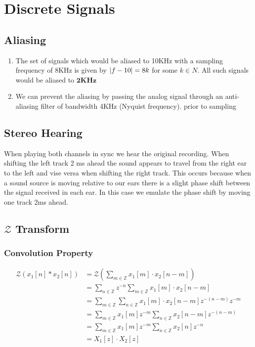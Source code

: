 \section{Discrete Signals}
\subsection{Aliasing}
\begin{enumerate}
  \item The set of signals which would be aliased to 10KHz with a sampling frequency of 8KHz is given by $\sizeof{f - 10} = 8k$ for some $k\in N$.
  All such signals would be aliased to $\textbf{2KHz}$

  \item We can prevent the aliasing by passing the analog signal through an anti-aliasing filter of bandwidth 4KHz (Nyquist frequency).
  prior to sampling
\end{enumerate}

\subsection{Stereo Hearing}
When playing both channels in sync we hear the original recording.
When shifting the left track 2 ms ahead the sound appears to travel from the right ear to the left and vise versa when shifting the right track.
This occurs because when a sound source is moving relative to our ears there is a slight phase shift between the signal received in each ear.
In this case we emulate the phase shift by moving one track 2ms ahead.


\subsection{$\mathcal{Z}$ Transform}

\subsubsection{Convolution Property}
\begin{equation}
  \begin{aligned}
    \mathcal{Z}\left( x_1[n] * x_2[n] \right) &= \mathcal{Z}\left( \sum_{m \in \mathbb{Z}} x_1[m] \cdot x_2[n-m] \right) \\
    &= \sum_{n \in \mathbb{Z}} z^{-n} \sum_{m \in \mathbb{Z}} x_1[m] \cdot x_2[n-m] \\
    &= \sum_{m \in \mathbb{Z}} \sum_{n \in \mathbb{Z}} x_1[m] \cdot x_2[n-m] z^{-(n-m)} z^{-m} \\
    &= \sum_{m \in \mathbb{Z}} x_1[m] z^{-m} \sum_{n \in \mathbb{Z}} x_2[n-m] z^{-(n-m)} \\
    &= \sum_{m \in \mathbb{Z}} x_1[m] z^{-m} \sum_{n \in \mathbb{Z}} x_2[n] z^{-n} \\
    &= X_1[z] \cdot X_2[z]
  \end{aligned}
\end{equation}

